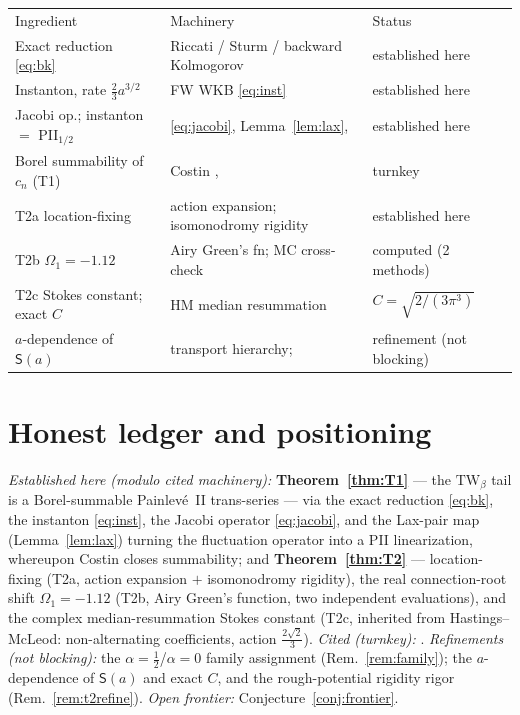 \documentclass[11pt,reqno]{amsart}
\theoremstyle{plain}
\theoremstyle{definition}
\theoremstyle{remark}
\newcommand{\TW}{\mathrm{TW}_\beta}
\begin{document}
\begin{center}
\small
\begin{tabular}{lll}
\hline\noalign{\smallskip}
Ingredient & Machinery & Status\\
\noalign{\smallskip}\hline\noalign{\smallskip}
Exact reduction \eqref{eq:bk}        & Riccati / Sturm / backward Kolmogorov      & \textsf{established here}\\
Instanton, rate $\tfrac23a^{3/2}$    & FW WKB \eqref{eq:inst}                     & \textsf{established here}\\
Jacobi op.; instanton $=$ PII${}_{1/2}$ & \eqref{eq:jacobi}, Lemma~\ref{lem:lax}, \cite{FN1980,FIKN} & \textsf{established here}\\
Borel summability of $c_n$ (T1)      & Costin \cite{Costin}, \cite{CCK,SGG}      & \textsf{turnkey}\\
T2a location-fixing                  & action expansion; isomonodromy rigidity   & \textsf{established here}\\
T2b $\Omega_1=-1.12$                 & Airy Green's fn; MC cross-check \cite{Viens} & \textsf{computed (2 methods)}\\
T2c Stokes constant; exact $C$ & HM median resummation \cite{CleriDunne,Dunne2025} & \textsf{$C=\sqrt{2/(3\pi^3)}$}\\
$a$-dependence of $\mathsf S(a)$      & transport hierarchy; \cite{FIKN}    & \textsf{refinement (not blocking)}\\
\hline
\end{tabular}
\end{center}

\section{Honest ledger and positioning}

\emph{Established here (modulo cited machinery):} \textbf{Theorem~\ref{thm:T1}} --- the $\TW$ tail is
a Borel-summable Painlev\'e~II trans-series --- via the exact reduction \eqref{eq:bk}, the instanton
\eqref{eq:inst}, the Jacobi operator \eqref{eq:jacobi}, and the Lax-pair map (Lemma~\ref{lem:lax})
turning the fluctuation operator into a PII linearization, whereupon Costin \cite{Costin} closes
summability; and \textbf{Theorem~\ref{thm:T2}} --- location-fixing (T2a, action expansion $+$
isomonodromy rigidity), the real connection-root shift $\Omega_1=-1.12$ (T2b, Airy Green's function,
two independent evaluations), and the complex median-resummation Stokes constant (T2c, inherited from
Hastings--McLeod: non-alternating coefficients, action $\tfrac{2\sqrt2}{3}$). \emph{Cited (turnkey):}
\cite{RRV,DV,CLDS,CleriDunne,Costin,CCK,SGG,TW1994,FN1980,JMU1981,AnicetoCrew,Viens}.
\emph{Refinements (not blocking):} the $\alpha=\tfrac12$/$\alpha=0$ family assignment
(Rem.~\ref{rem:family}); the $a$-dependence of $\mathsf S(a)$ and exact $C$, and the rough-potential
rigidity rigor (Rem.~\ref{rem:t2refine}). \emph{Open frontier:} Conjecture~\ref{conj:frontier}.
\end{document}
